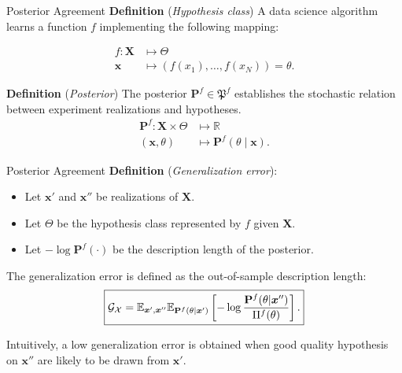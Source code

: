 \begin{frame}{Posterior Agreement}
	\textbf{Definition} (\textit{Hypothesis class})
    A data science algorithm learns a function $f$ implementing the following mapping:

    $$
    \begin{aligned}
        f: \bm{X} & \longmapsto \Theta \\
        \bm{x}  & \longmapsto (f(x_1), \dots, f(x_N)) = \theta.
    \end{aligned}
    $$

	\textbf{Definition} (\textit{Posterior})
	The posterior $\mathbf{P}^f \in \mathfrak{P}^f$ establishes the stochastic relation between experiment realizations and hypotheses.
	$$
	\begin{aligned}
		\mathbf{P}^f: \bm{X} \times \Theta & \longmapsto \mathbb{R} \\
		(\bm{x}, \theta) & \longmapsto \mathbf{P}^f (\theta \mid \bm{x}).
	\end{aligned}
	$$
\end{frame}

\begin{frame}{Posterior Agreement}
	\textbf{Definition} (\textit{Generalization error}):
	\begin{itemize}
		\item Let $\bm{x'}$ and $\bm{x''}$ be realizations of $\bm{X}$.
		\item Let $\Theta$ be the hypothesis class represented by $f$ given $\bm{X}$. 
		\item Let $- \log \mathbf{P}^f (\cdot)$ be the description length of the posterior.
		
	\end{itemize}
		The generalization error is defined as the out-of-sample description length:
		$$
		\textcolor{black}{
        \boxed{
			\mathcal{G}_{\mathcal{X}} = \mathbb{E}_{\bm{x}', \bm{x}''} \mathbb{E}_{\mathbf{P}^f( \theta \mid \bm{x}')} \left[ - \log \frac{\mathbf{P}^f(\theta | \bm{x}'')}{\Pi^f (\theta)} \right].
			}
		}
		$$

		Intuitively, a low generalization error is obtained when good quality hypothesis
		on $\bm{x}''$ are likely to be drawn from $\bm{x}'$. 
\end{frame}


